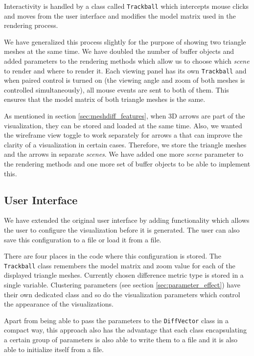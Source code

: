 Interactivity is handled by a class called \verb+Trackball+ which intercepts mouse clicks and moves from the user interface and modifies the model matrix used in the rendering process.

We have generalized this process slightly for the purpose of showing two triangle meshes at the same time. We have doubled the number of buffer objects and added parameters to the rendering methods which allow us to choose which {\it scene} to render and where to render it. Each viewing panel has its own \verb+Trackball+ and when paired control is turned on (the viewing angle and zoom of both meshes is controlled simultaneously), all mouse events are sent to both of them. This ensures that the model matrix of both triangle meshes is the same.

As mentioned in section \ref{sec:meshdiff_features}, when 3D arrows are part of the visualization, they can be stored and loaded at the same time. Also, we wanted the wireframe view toggle to work separately for arrows a that can improve the clarity of a visualization in certain cases. Therefore, we store the triangle meshes and the arrows in separate {\it scenes}. We have added one more {\it scene} parameter to the rendering methods and one more set of buffer objects to be able to implement this.
\subsection{User Interface}

We have extended the original user interface by adding functionality which allows the user to configure the visualization before it is generated. The user can also save this configuration to a file or load it from a file.

There are four places in the code where this configuration is stored. The \verb+Trackball+ class remembers the model matrix and zoom value for each of the displayed triangle meshes. Currently chosen difference metric type is stored in a single variable. Clustering parameters (see section \ref{sec:parameter_effect}) have their own dedicated class and so do the visualization parameters which control the appearance of the visualizations.

Apart from being able to pass the parameters to the \verb+DiffVector+ class in a compact way, this approach also has the advantage that each class encapsulating a certain group of parameters is also able to write them to a file and it is also able to initialize itself from a file\footnotemark.

